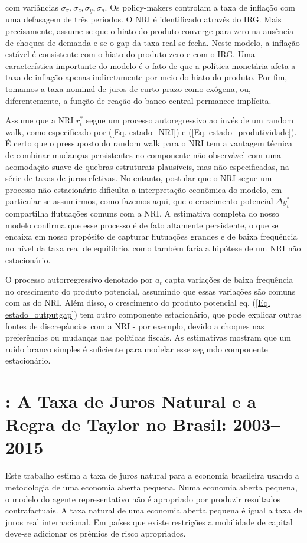\documentclass[11pt,oneside,a4paper]{article}
\begin{document}
com variâncias $\sigma_{\pi}, \sigma_z, \sigma_y, \sigma_a $. Os policy-makers controlam a taxa de inflação com uma defasagem de três períodos. O NRI é identificado através do IRG. Mais precisamente, assume-se que o hiato do produto converge para zero na ausência de choques de demanda e se o gap da taxa real se fecha. Neste modelo, a inflação estável é consistente com o hiato do produto zero e com o IRG. Uma característica importante do modelo é o fato de que a política monetária afeta a taxa de inflação apenas indiretamente por meio do hiato do produto. Por fim, tomamos a taxa nominal de juros de curto prazo como exógena, ou, diferentemente, a função de reação do banco central permanece implícita.

Assume que a NRI $r_t^{*}$ segue um processo autoregressivo ao invés de um random walk, como especificado por (\ref{Eq. estado_NRI}) e (\ref{Eq. estado_produtividade}). É certo que o pressuposto do random walk para o NRI tem a vantagem técnica de combinar mudanças persistentes no componente não observável com uma acomodação suave de quebras estruturais plausíveis, mas não especificadas, na série de taxas de juros efetivas. No entanto, postular que o NRI segue um processo não-estacionário dificulta a interpretação econômica do modelo, em particular se assumirmos, como fazemos aqui, que o crescimento potencial $\Delta y_t^{*}$ compartilha flutuações comuns com a NRI. A estimativa completa do nosso modelo confirma que esse processo é de fato altamente persistente, o que se encaixa em nosso propósito de capturar flutuações grandes e de baixa frequência no nível da taxa real de equilíbrio, como também faria a hipótese de um NRI não estacionário.

O processo autorregressivo denotado por $a_t$ capta variações de baixa frequência no crescimento do produto potencial, assumindo que essas variações são comuns com as do NRI. Além disso, o crescimento do produto potencial eq. (\ref{Eq. estado_outputgap}) tem outro componente estacionário, que pode explicar outras fontes de discrepâncias com a NRI - por exemplo, devido a choques nas preferências ou mudanças nas políticas fiscais. As estimativas mostram que um ruído branco simples é suficiente para modelar esse segundo componente estacionário.
%
%
\section{\citet{Barbosa:2016}: A Taxa de Juros Natural e a Regra de Taylor no Brasil: 2003–2015 }

Este trabalho estima a taxa de juros natural para a economia brasileira usando a metodologia de uma economia aberta pequena. Numa economia aberta pequena, o modelo do agente representativo não é apropriado por produzir resultados contrafactuais. A taxa natural de uma economia aberta pequena é igual a taxa de juros real internacional. Em países que existe restrições a mobilidade de capital deve-se adicionar os prêmios de risco apropriados.
\end{document}
